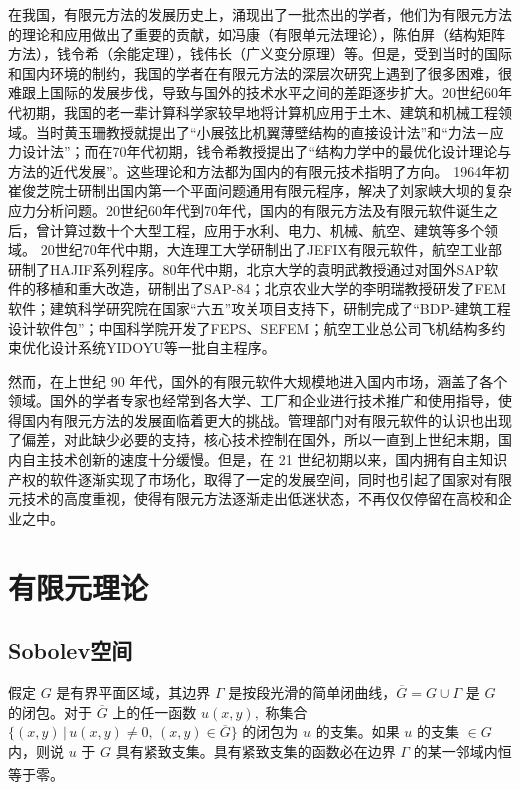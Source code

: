 \documentclass[a4paper,UTF8,titlepage,10pt]{ctexart}
\numberwithin{equation}{subsection}
\begin{document}
在我国，有限元方法的发展历史上，涌现出了一批杰出的学者，他们为有限元方法的理论和应用做出了重要的贡献，如冯康（有限单元法理论），陈伯屏（结构矩阵方法），钱令希（余能定理），钱伟长（广义变分原理）等。但是，受到当时的国际和国内环境的制约，我国的学者在有限元方法的深层次研究上遇到了很多困难，很难跟上国际的发展步伐，导致与国外的技术水平之间的差距逐步扩大。20世纪60年代初期，我国的老一辈计算科学家较早地将计算机应用于土木、建筑和机械工程领域。当时黄玉珊教授就提出了“小展弦比机翼薄壁结构的直接设计法”和“力法－应力设计法”；而在70年代初期，钱令希教授提出了“结构力学中的最优化设计理论与方法的近代发展”。这些理论和方法都为国内的有限元技术指明了方向。
1964年初崔俊芝院士研制出国内第一个平面问题通用有限元程序，解决了刘家峡大坝的复杂应力分析问题。20世纪60年代到70年代，国内的有限元方法及有限元软件诞生之后，曾计算过数十个大型工程，应用于水利、电力、机械、航空、建筑等多个领域。
20世纪70年代中期，大连理工大学研制出了JEFIX有限元软件，航空工业部研制了HAJIF系列程序。80年代中期，北京大学的袁明武教授通过对国外SAP软件的移植和重大改造，研制出了SAP-84；北京农业大学的李明瑞教授研发了FEM软件；建筑科学研究院在国家“六五”攻关项目支持下，研制完成了“BDP-建筑工程设计软件包”；中国科学院开发了FEPS、SEFEM；航空工业总公司飞机结构多约束优化设计系统YIDOYU等一批自主程序。

然而，在上世纪 90 年代，国外的有限元软件大规模地进入国内市场，涵盖了各个领域。国外的学者专家也经常到各大学、工厂和企业进行技术推广和使用指导，使得国内有限元方法的发展面临着更大的挑战。管理部门对有限元软件的认识也出现了偏差，对此缺少必要的支持，核心技术控制在国外，所以一直到上世纪末期，国内自主技术创新的速度十分缓慢。但是，在 21 世纪初期以来，国内拥有自主知识产权的软件逐渐实现了市场化，取得了一定的发展空间，同时也引起了国家对有限元技术的高度重视，使得有限元方法逐渐走出低迷状态，不再仅仅停留在高校和企业之中。

\newpage

\section{有限元理论}

\subsection{Sobolev空间}

假定 $G$ 是有界平面区域，其边界 $\Gamma$ 是按段光滑的简单闭曲线，$\overline{G} = G \cup \Gamma$ 是 $G$ 的闭包。对于 $\overline{G}$ 上的任一函数 $u(x,y),$ 称集合$\{(x,y) \, | \, u(x,y) \ne 0, \, (x,y) \in \overline{G}\}$ 的闭包为 $u$ 的支集。如果 $u$ 的支集 $\in G$ 内，则说 $u$ 于 $G$ 具有紧致支集。具有紧致支集的函数必在边界 $\Gamma$ 的某一邻域内恒等于零\textsuperscript{\cite{李荣华2007偏微分方程数值解}}。
\end{document}
